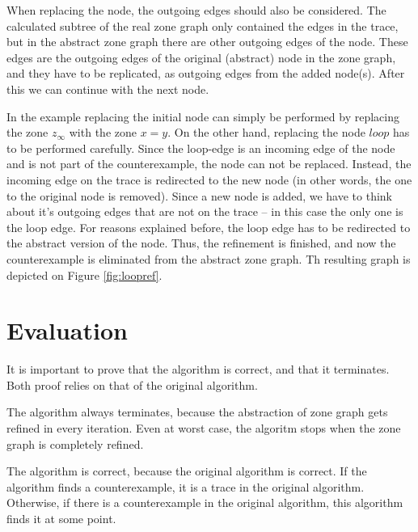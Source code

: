 When replacing the node, the outgoing edges should also be considered. The calculated subtree of the real zone graph only contained the edges in the trace, but in the abstract zone graph there are other outgoing edges of the node. These edges are the outgoing edges of the original (abstract) node in the zone graph, and they have to be replicated, as outgoing edges from the added node(s). After this we can continue with the next node.

\begin{example}
In the example replacing the initial node can simply be performed by replacing the zone $z_\infty$ with the zone $x=y$. On the other hand, replacing the node $loop$ has to be performed carefully. Since the loop-edge is an incoming edge of the node and is not part of the counterexample, the node can not be replaced. Instead, the incoming edge on the trace is redirected to the new node (in other words, the one to the original node is removed). Since a new node is added, we have to think about it's outgoing edges that are not on the trace -- in this case the only one is the loop edge. For reasons explained before, the loop edge has to be redirected to the abstract version of the node. Thus, the refinement is finished, and now the counterexample is eliminated from the abstract zone graph. Th resulting graph is depicted on Figure \ref{fig:loopref}.
\end{example}




\section{Evaluation}

It is important to prove that the algorithm is correct, and that it terminates. Both proof relies on that of the original algorithm.

The algorithm always terminates, because the abstraction of zone graph gets refined in every iteration. Even at worst case, the algoritm stops when the zone graph is completely refined.

The algorithm is correct, because the original algorithm is correct. If the algorithm finds a counterexample, it is a trace in the original algorithm. Otherwise, if there is a counterexample in the original algorithm, this algorithm finds it at some point.




